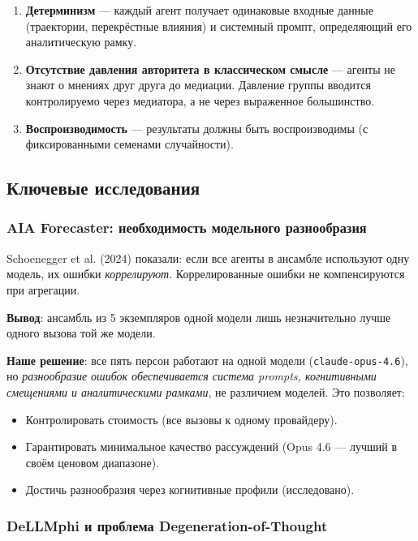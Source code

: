 \begin{enumerate}
    \item \textbf{Детерминизм} — каждый агент получает одинаковые входные данные (траектории, перекрёстные влияния) и системный промпт, определяющий его аналитическую рамку.

    \item \textbf{Отсутствие давления авторитета в классическом смысле} — агенты не знают о мнениях друг друга до медиации. Давление группы вводится контролируемо через медиатора, а не через выраженное большинство.

    \item \textbf{Воспроизводимость} — результаты должны быть воспроизводимы (с фиксированными семенами случайности).
\end{enumerate}

\subsection{Ключевые исследования}

\subsubsection{AIA Forecaster: необходимость модельного разнообразия}

Schoenegger et al. (2024) показали: если все агенты в ансамбле используют одну модель, их ошибки \emph{коррелируют}. Коррелированные ошибки не компенсируются при агрегации.

\textbf{Вывод}: ансамбль из 5 экземпляров одной модели лишь незначительно лучше одного вызова той же модели.

\textbf{Наше решение}: все пять персон работают на одной модели (\texttt{claude-opus-4.6}), но \emph{разнообразие ошибок обеспечивается система prompts, когнитивными смещениями и аналитическими рамками}, не различием моделей. Это позволяет:
\begin{itemize}
    \item Контролировать стоимость (все вызовы к одному провайдеру).
    \item Гарантировать минимальное качество рассуждений (Opus 4.6 — лучший в своём ценовом диапазоне).
    \item Достичь разнообразия через когнитивные профили (исследовано).
\end{itemize}

\subsubsection{DeLLMphi и проблема Degeneration-of-Thought}


